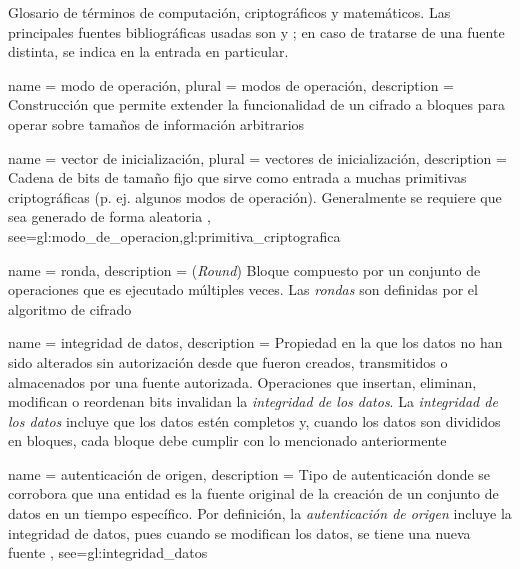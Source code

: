 %
%
%


\makeglossaries

\setglossarypreamble
{%
  Glosario de términos de computación, criptográficos y matemáticos. Las
  principales fuentes bibliográficas usadas son \cite{menezes} y
  \cite{stallings}; en caso de tratarse de una fuente distinta, se indica en la
  entrada en particular.
}

{
  name = modo de operación,
  plural = modos de operación,
  description = {
    Construcción que permite extender la funcionalidad de un cifrado a bloques
    para operar sobre tamaños de información arbitrarios%
  }
}

{
  name = vector de inicialización,
  plural = vectores de inicialización,
  description = {
    Cadena de bits de tamaño fijo que sirve como entrada a muchas primitivas
    criptográficas (p. ej. algunos modos de operación). Generalmente
    se requiere que sea generado de forma aleatoria%
  },
  see={gl:modo_de_operacion,gl:primitiva_criptografica}
}

{
  name = ronda,
  description = {
    (\textit{Round}) Bloque compuesto por un conjunto de operaciones que es
    ejecutado múltiples veces. Las \textit{rondas} son definidas por el
    algoritmo de cifrado%
  }
}

{
  name = integridad de datos,
  description = {
    Propiedad en la que los datos no han sido alterados sin autorización desde
    que fueron creados, transmitidos o almacenados por una fuente autorizada.
    Operaciones que insertan, eliminan, modifican o reordenan bits invalidan
    la \textit{integridad de los datos}. La \textit{integridad de los datos}
    incluye que los datos estén completos y, cuando los datos son divididos en
    bloques, cada bloque debe cumplir con lo mencionado anteriormente%
  }
}

{
  name = autenticación de origen,
  description = {
    Tipo de autenticación donde se corrobora que una entidad es la fuente
    original de la creación de un conjunto de datos en un tiempo específico.
    Por definición, la \textit{autenticación de origen} incluye la integridad
    de datos, pues cuando se modifican los datos, se tiene una nueva fuente%
  },
  see={gl:integridad_datos}
}

